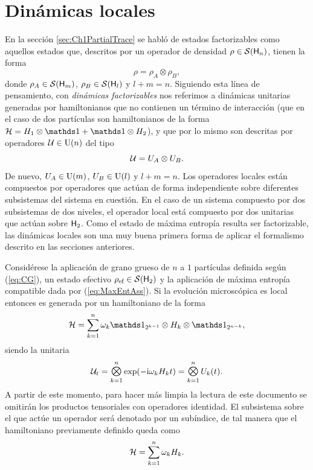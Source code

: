 \section{Dinámicas locales}

En la sección \ref{sec:Ch1PartialTrace} se habló de estados factorizables como aquellos estados que, descritos por un operador de densidad $\rho\in\mathcal{S}({\sf H}_{n})$, tienen la forma
\begin{equation}
    \rho=\rho_{A}\otimes\rho_{B},\nonumber
\end{equation}
donde $\rho_{A}\in\mathcal{S}({\sf H}_{m})$, $\rho_{B}\in\mathcal{S}({\sf H}_{l})$ y $l+m=n$. Siguiendo esta línea de pensamiento, con \textit{dinámicas factorizables} nos referimos a dinámicas unitarias generadas por hamiltonianos que no contienen un término de interacción (que en el caso de dos partículas son hamiltonianos de la forma $\mcH=H_{1}\otimes\Id+\Id\otimes H_{2}$), y que por lo mismo son descritas por operadores $\mathcal{U}\in\text{U}(n)$  del tipo
\begin{equation}
    \mathcal{U}=U_{A}\otimes U_{B}.\nonumber
\end{equation}
De nuevo, $U_{A}\in\text{U}(m)$, $U_{B}\in\text{U}(l)$ y $l+m=n$. Los operadores locales están compuestos por operadores que actúan de forma independiente sobre diferentes subsistemas del sistema en cuestión. En el caso de un sistema compuesto por dos subsistemas de dos niveles, el operador local está compuesto por dos unitarias que actúan sobre ${\sf H}_{2}$. Como el estado de máxima entropía resulta ser factorizable, las dinámicas locales son una muy buena primera forma de aplicar el formalismo descrito en las secciones anteriores.

Considérese la aplicación de grano grueso de $n$ a $1$ partículas definida según (\ref{eq:CG}), un estado efectivo $\rho_{\text{ef}}\in\mathcal{S}({\sf H}_{2})$ y la aplicación de máxima entropía compatible dada por (\ref{eq:MaxEntAss}). Si la evolución microscópica es local entonces es generada por un hamiltoniano de la forma
\begin{equation}
    \mcH=\sum_{k=1}^{n}\omega_{k}\Id_{2^{k-1}}\otimes H_{k} \otimes \Id_{2^{n-k}},\nonumber
\end{equation}
siendo la unitaria 
\begin{equation}\label{eq:NFactorUnitaries}
    \mcU_{t}=\Motimes_{k=1}^{n}\text{exp}\qty(-\rmi\omega_{k}H_{k}t)=\Motimes_{k=1}^{n} U_{k}(t).
\end{equation}
A partir de este momento, para hacer más limpia la lectura de este documento se omitirán los productos tensoriales con operadores identidad. El subsistema sobre el que actúe un operador será denotado por un subíndice, de tal manera que el hamiltoniano previamente definido queda como
\begin{equation}
    \mathcal{H}=\sum_{k=1}^{n}\omega_{k}H_{k}.\nonumber
\end{equation}


